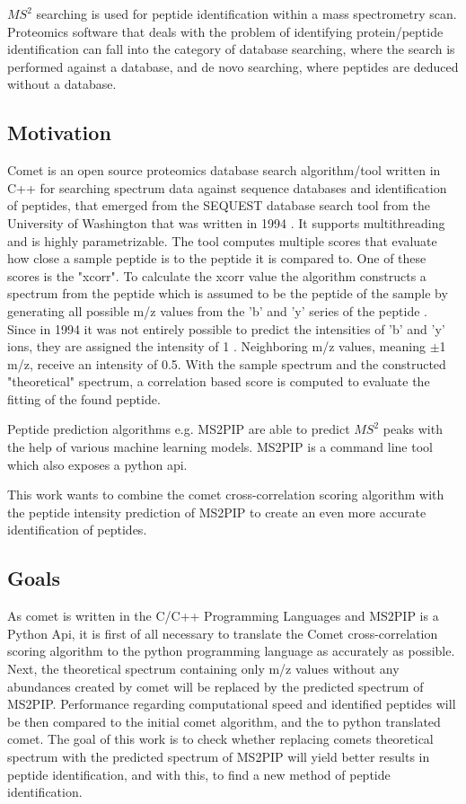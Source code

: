 \documentclass[12pt]{article}
\begin{document}
\(MS^2\) searching is used for peptide identification within a mass spectrometry scan. Proteomics software that deals with the problem of identifying protein/peptide identification can fall into the category of database searching, where the search is performed against a database, and de novo searching, where peptides are deduced without a database.

\subsection{Motivation}
Comet is an open source proteomics database search algorithm/tool written in C++ for searching spectrum data against sequence databases and identification of peptides, that emerged from the SEQUEST database search tool from the University of Washington that was written in 1994 \cite{comet-search-tool}. It supports multithreading and is highly parametrizable. The tool computes multiple scores that evaluate how close a sample peptide is to the peptide it is compared to. One of these scores is the "xcorr". To calculate the xcorr value the algorithm constructs a spectrum from the peptide which is assumed to be the peptide of the sample by generating all possible m/z values from the 'b' and 'y' series of the peptide \cite{comet-first-paper}. Since in 1994 it was not entirely possible to predict the intensities of 'b' and 'y' ions, they are assigned the intensity of 1 \cite{deeper-look-into-comet}. Neighboring m/z values, meaning $\pm$1 m/z, receive an intensity of 0.5. With the sample spectrum and the constructed "theoretical" spectrum, a correlation based score is computed
to evaluate the fitting of the found peptide.

Peptide prediction algorithms e.g. MS2PIP\cite{ms2pip} are able to predict \(MS^2\) peaks with the help of various machine learning models.
MS2PIP is a command line tool which also exposes a python api.

This work wants to combine the comet cross-correlation scoring algorithm
with the peptide intensity prediction of MS2PIP to create an even more accurate identification of peptides.


\subsection{Goals}
As comet is written in the C/C++ Programming Languages and MS2PIP is a Python Api, it is first of all necessary to translate the Comet cross-correlation scoring algorithm to the python programming language as accurately as possible. Next, the theoretical spectrum containing only m/z values without any abundances created by comet will be replaced by the predicted spectrum of MS2PIP. Performance regarding computational speed and identified peptides will be then compared to the initial comet algorithm, and the to python translated comet.
The goal of this work is to check whether replacing comets theoretical spectrum with the predicted spectrum of MS2PIP will yield better results in peptide identification, and with this, to find a new method of peptide identification.
\end{document}
